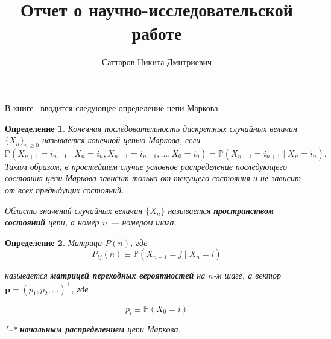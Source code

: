 \documentclass[specialist, substylefile = spbu_report.rtx, subf,href,colorlinks=true, 12pt]{disser}
\newtheorem{mydef}{Определение}
\newcommand{\ds}{\displaystyle}
\begin{document}
%
%


\title{Отчет о научно-исследовательской работе}


\author{Саттаров Никита Дмитриевич}




\date{\number\year}

\maketitle

\intro

В книге~\cite[Гл. 6]{stirzaker1992probability} вводится следующее определение цепи Маркова:
\begin{mydef}\label{eq:eq1}
	Конечная последовательность дискретных случайных величин $\{X_{n}\}_{n \geq 0}$ называется конечной цепью Маркова, если
	\begin{equation}
	\mathbb{P}(X_{n+1}=i_{n+1} \mid X_{n} = i_{n}, X_{n-1} = i_{n-1}, \ldots , X_{0} = i_{0}) = \mathbb{P} (X_{n+1}=i_{n+1} \mid X_{n} = i_{n}).
	\end{equation}
	Таким образом, в простейшем случае условное распределение последующего состояния цепи Маркова зависит только от текущего состояния и не зависит от всех предыдущих состояний.
	
	Область значений случайных величин ${\ds \{X_{n}\} }$ называется {\bfseries пространством состояний} цепи, а номер $n$ — номером шага.
\end{mydef}

\begin{mydef}\label{eq:eq2}
	Матрица ${\ds P(n)}$, где
	\begin{equation}
		P_{ij}(n) \equiv \mathbb {P}(X_{n+1} = j \mid X_{n}=i)
	\end{equation}
	
	называется {\bfseries матрицей переходных вероятностей} на $n$-м шаге, а вектор\\ ${\ds\mathbf{p} = (p_{1},p_{2},\ldots )^{\top }}$, где
	
	\begin{equation}
		p_{i} \equiv \mathbb  {P} (X_{0} = i)
	\end{equation}
	
	"--* {\bfseries начальным распределением} цепи Маркова.
\end{mydef}
\end{document}
